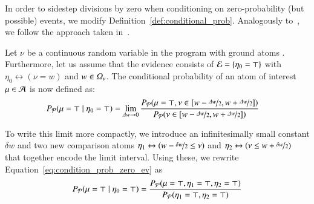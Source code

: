In order to sidestep divisions by zero when conditioning on zero-probability (but possible) events, we modify Definition~\ref{def:conditional_prob}. Analogously to~\citet{nitti2016probabilistic}, we follow the approach taken in~\citep{kadane2011principles}. 
 
 
\begin{definition}
\label{def:conditional_prob_zero_event}
Let $\nu$ be a continuous random variable in the \dcproblogsty program \dcpprogram with ground atoms \herbrandbase. Furthermore, let us assume that the evidence consists of $\mathcal{E} = \{ \eta_0 = \top  \}$ with $\eta_0\leftrightarrow (\nu=w)$ and $w\in \Omega_\nu$.
The conditional probability of an atom of interest $\mu\in \mathcal{A}$ is now defined as:
\begin{align}
    P_\mathcal{P} (\mu= \top \mid \eta_0= \top)
    &= \lim_{\Delta w \rightarrow 0}
    \frac{P_\mathcal{P}(\mu=\top, \nu \in [w-\nicefrac{\Delta w}{2}, w+\nicefrac{\Delta w}{2} ]) }{P_\mathcal{P}(\nu \in [w-\nicefrac{\Delta w}{2}, w+\nicefrac{\Delta w}{2} ] )} \label{eq:condition_prob_zero_ev}
\end{align}
\end{definition}

To write this limit more compactly, we introduce an 
infinitesimally small constant $\delta w$ and two new comparison atoms  $\eta_1 \leftrightarrow ( w-\nicefrac{\delta w}{2} \leq  \nu)$ and $\eta_2 \leftrightarrow (\nu \leq w+\nicefrac{\delta w}{2} )$ that together encode the limit interval.
Using these, we rewrite Equation~\ref{eq:condition_prob_zero_ev} as
\begin{align}
    P_\mathcal{P} (\mu = \top \mid \eta_0 = \top) =  \frac{P_\mathcal{P}(\mu=\top,  \eta_1=\top, \eta_2=\top )}{P_\mathcal{P}( \eta_1=\top, \eta_2=\top )}
\end{align}

